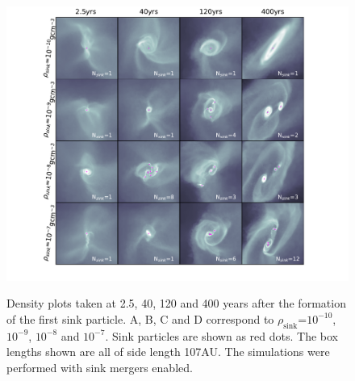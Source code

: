 \documentclass[fleqn,usenatbib]{mnras}
\begin{document}
\begin{figure}
	\hbox{\hspace{-2cm} \includegraphics[scale=1]{grid1.pdf}}
    \caption{Density plots taken at 2.5, 40, 120 and 400 years after the formation of the first sink particle. A, B, C and D correspond to $\rho_{\text{sink}}$=$10^{-10}$,$10^{-9}$, $10^{-8}$ and $10^{-7}$. Sink particles are shown as red dots. The box lengths shown are all of side length 107AU. The simulations were performed with sink mergers enabled.}
    \label{fig:grid}
\end{figure}
\end{document}
